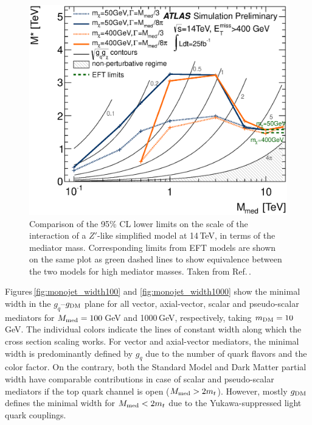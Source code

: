 \begin{figure}
\centering
\includegraphics[width=0.9\linewidth]{figures/monojet/lambda_14TeV_SR1.eps}
\caption{Comparison of the 95\% CL lower limits on the scale of the interaction of a $Z'$-like simplified model at 14\,TeV, in terms of the mediator mass. Corresponding limits from EFT models are shown on the same plot as green dashed lines to show equivalence between the two models for high mediator masses.
Taken from Ref.\,\cite{ATL-PHYS-PUB-2014-007}.}
\label{fig:monojet_MstarMmed}
\end{figure}



Figures\,\ref{fig:monojet_width100} and \ref{fig:monojet_width1000} show the minimal width in the $g_q$--$g_{\rm{DM}}$ plane for all vector, axial-vector, scalar and pseudo-scalar mediators for $M_{\rm{med}}=100$\,GeV and 1000\,GeV, respectively, taking $m_{\rm{DM}}=10$\,GeV. The individual colors indicate the lines of constant width along which the cross section scaling works. For vector and axial-vector mediators, the minimal width is predominantly defined by $g_q$ due to the number of quark flavors and the color factor. %
On the contrary, both the Standard Model and Dark Matter partial width have comparable contributions in case of scalar and pseudo-scalar mediators if the top quark channel is open ($M_{\rm{med}}>2m_t$). However, mostly $g_{\rm{DM}}$ defines the minimal width for $M_{\rm{med}}<2m_t$ due to the Yukawa-suppressed light quark couplings.


